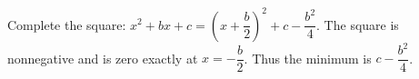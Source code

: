 Complete the square: $x^2+bx+c=\left(x+\dfrac{b}{2}\right)^2+c-\dfrac{b^2}{4}$. The square is nonnegative and is zero exactly at $x=-\dfrac{b}{2}$. Thus the minimum is $\boxed{c-\dfrac{b^2}{4}}$.
